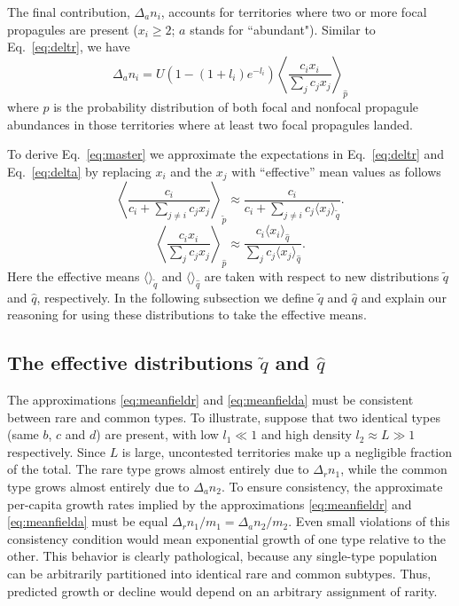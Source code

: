 \documentclass[12pt]{article}
\begin{document}
The final contribution, $\Delta_a n_i$, accounts for territories where two or more focal propagules are present ($x_i\geq 2$; $a$ stands for ``abundant"). Similar to Eq.~\eqref{eq:deltr}, we have 
\begin{equation}
\Delta_a n_i=U(1-(1+l_i)e^{-l_i})\left\langle \frac{c_i x_i}{\sum_j c_j x_j} \right\rangle_{\hat{p}}\label{eq:delta}
\end{equation}
where $\hat{p}$ is the probability distribution of both focal and nonfocal propagule abundances in those territories where at least two focal propagules landed. 

To derive Eq.~\eqref{eq:master} we approximate the expectations in Eq.~\eqref{eq:deltr} and Eq.~\eqref{eq:delta} by replacing $x_i$ and the $x_j$ with ``effective'' mean values as follows 
\begin{equation}
\left\langle\frac{c_i}{c_i +\sum_{j\neq i} c_j x_j}\right\rangle_{\tilde{p}}\approx \frac{c_i}{c_i +\sum_{j\neq i} c_j \langle x_j\rangle_{\tilde{q}}}.\label{eq:meanfieldr}
\end{equation}
\begin{equation}
\left\langle \frac{c_i x_i}{\sum_j c_j x_j} \right\rangle_{\hat{p}}\approx  \frac{c_i \langle x_i \rangle_{\hat{q}}}{\sum_j c_j \langle x_j\rangle_{\hat{q}}}.\label{eq:meanfielda}
\end{equation}
Here the effective means $\langle \rangle_{\tilde{q}}$ and $\langle \rangle_{\hat{q}}$ are taken with respect to new distributions $\tilde{q}$ and $\hat{q}$, respectively. In the following subsection we define $\tilde{q}$ and $\hat{q}$ and explain our reasoning for using these distributions to take the effective means. 

\subsection*{The effective distributions $\tilde{q}$ and $\hat{q}$}

The approximations \eqref{eq:meanfieldr} and \eqref{eq:meanfielda} must be consistent between rare and common types. To illustrate, suppose that two identical types (same $b$, $c$ and $d$) are present, with low $l_1\ll 1$ and high density $l_2\approx L\gg 1$ respectively. Since $L$ is large, uncontested territories make up a negligible fraction of the total. The rare type grows almost entirely due to $\Delta_r n_1$, while the common type grows almost entirely due to $\Delta_a n_2$. To ensure consistency, the approximate per-capita growth rates implied by the approximations \eqref{eq:meanfieldr} and \eqref{eq:meanfielda} must be equal $\Delta_r n_1/m_1 = \Delta_a n_2/m_2$. Even small violations of this consistency condition would mean exponential growth of one type relative to the other. This behavior is clearly pathological, because any single-type population can be arbitrarily partitioned into identical rare and common subtypes. Thus,   predicted growth or decline would depend on an arbitrary assignment of rarity.
\end{document}
